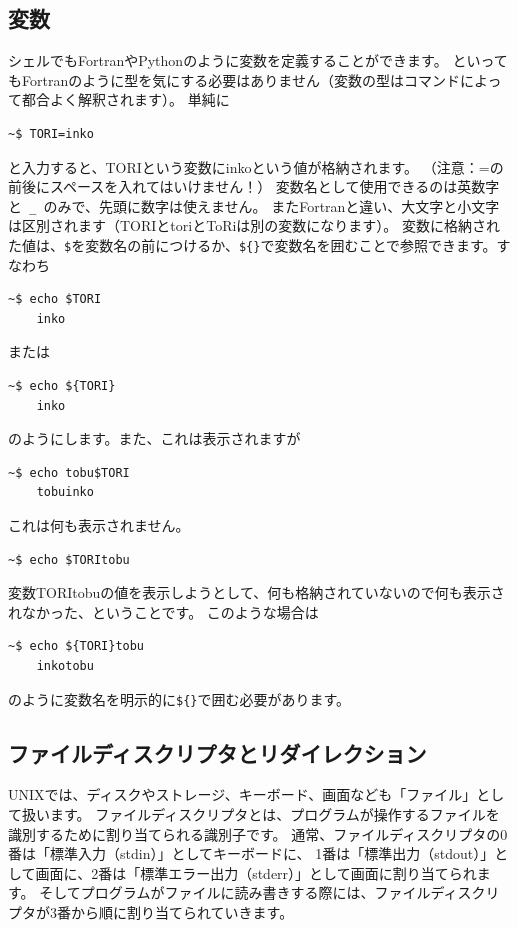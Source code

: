 \documentclass[a4j]{ltjsreport}
\begin{document}
    \subsection{変数}
    シェルでもFortranやPythonのように変数を定義することができます。
    といってもFortranのように型を気にする必要はありません（変数の型はコマンドによって都合よく解釈されます）。
    単純に
    \begin{lstlisting}[numbers=none]
    ~$ TORI=inko
    \end{lstlisting}
    と入力すると、TORIという変数にinkoという値が格納されます。
    （注意：=の前後にスペースを入れてはいけません！）
    変数名として使用できるのは英数字と\texttt{ \_ }のみで、先頭に数字は使えません。
    またFortranと違い、大文字と小文字は区別されます（TORIとtoriとToRiは別の変数になります）。
    変数に格納された値は、\texttt{\$}を変数名の前につけるか、\texttt{\$\{\quad\}}で変数名を囲むことで参照できます。すなわち
    \begin{lstlisting}[numbers=none]
    ~$ echo $TORI
    inko
    \end{lstlisting}
    または
    \begin{lstlisting}[numbers=none]
    ~$ echo ${TORI}
    inko
    \end{lstlisting}
    のようにします。また、これは表示されますが
    \begin{lstlisting}[numbers=none]
    ~$ echo tobu$TORI
    tobuinko
    \end{lstlisting}
    これは何も表示されません。
    \begin{lstlisting}[numbers=none]
    ~$ echo $TORItobu
    \end{lstlisting}
    変数TORItobuの値を表示しようとして、何も格納されていないので何も表示されなかった、ということです。
    このような場合は
    \begin{lstlisting}[numbers=none]
    ~$ echo ${TORI}tobu
    inkotobu
    \end{lstlisting}
    のように変数名を明示的に\texttt{\$\{\quad\}}で囲む必要があります。

    \subsection{ファイルディスクリプタとリダイレクション}
    UNIXでは、ディスクやストレージ、キーボード、画面なども「ファイル」として扱います。
    ファイルディスクリプタとは、プログラムが操作するファイルを識別するために割り当てられる識別子です。
    通常、ファイルディスクリプタの0番は「標準入力（stdin）」としてキーボードに、
    1番は「標準出力（stdout）」として画面に、2番は「標準エラー出力（stderr）」として画面に割り当てられます。
    そしてプログラムがファイルに読み書きする際には、ファイルディスクリプタが3番から順に割り当てられていきます。
\end{document}
